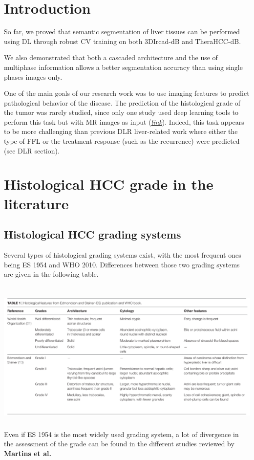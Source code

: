 \documentclass[]{article}
\begin{document}
\section{Introduction}\label{introduction}

So far, we proved that semantic segmentation of liver tissues can be
performed using DL through robust CV training on both 3DIrcad-dB and
TheraHCC-dB.

We also demonstrated that both a cascaded architecture and the use of
multiphase information allows a better segmentation accuracy than using
single phases images only.

One of the main goals of our research work was to use imaging features
to predict pathological behavior of the disease. The prediction of the
histological grade of the tumor was rarely studied, since only one study
used deep learning tools to perform this task but with MR images as
input
(\href{https://www.hindawi.com/journals/bmri/2019/9783106/}{\emph{link}}).
Indeed, this task appears to be more challenging than previous DLR
liver-related work where either the type of FFL or the treatment
response (such as the recurrence) were predicted (see DLR section).

\section{Histological HCC grade in the literature
}\label{histological-hcc-grade-in-the-literature}

\subsection{Histological HCC grading
systems}\label{histological-hcc-grading-systems}

Several types of histological grading systems exist, with the most
frequent ones being ES 1954 and WHO 2010. Differences between those two
grading systems are given in the following table.

\includegraphics[width=6.26772in,height=3.01389in]{./images/media/image4.png}\\
Even if ES 1954 is the most widely used grading system, a lot of
divergence in the assessment of the grade can be found in the different
studies reviewed by \textbf{Martins et al.}
\end{document}

